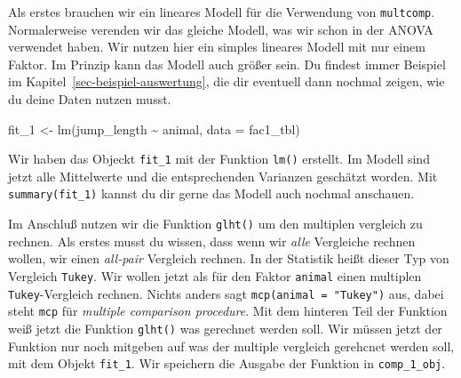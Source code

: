 \documentclass[
  letterpaper,
]{scrbook}
\newenvironment{Shaded}{\begin{snugshade}}{\end{snugshade}}
\newcommand{\AttributeTok}[1]{\textcolor[rgb]{0.40,0.45,0.13}{#1}}
\newcommand{\FunctionTok}[1]{\textcolor[rgb]{0.28,0.35,0.67}{#1}}
\newcommand{\NormalTok}[1]{\textcolor[rgb]{0.00,0.23,0.31}{#1}}
\newcommand{\OtherTok}[1]{\textcolor[rgb]{0.00,0.23,0.31}{#1}}
\newcommand{\SpecialCharTok}[1]{\textcolor[rgb]{0.37,0.37,0.37}{#1}}
\begin{document}

Als erstes brauchen wir ein lineares Modell für die Verwendung von
\texttt{multcomp}. Normalerweise verenden wir das gleiche Modell, was
wir schon in der ANOVA verwendet haben. Wir nutzen hier ein simples
lineares Modell mit nur einem Faktor. Im Prinzip kann das Modell auch
größer sein. Du findest immer Beispiel im
Kapitel~\ref{sec-beispiel-auswertung}, die dir eventuell dann nochmal
zeigen, wie du deine Daten nutzen musst.

\begin{Shaded}
\begin{Highlighting}[]
\NormalTok{fit\_1 }\OtherTok{\textless{}{-}} \FunctionTok{lm}\NormalTok{(jump\_length }\SpecialCharTok{\textasciitilde{}}\NormalTok{ animal, }\AttributeTok{data =}\NormalTok{ fac1\_tbl)}
\end{Highlighting}
\end{Shaded}

Wir haben das Objeckt \texttt{fit\_1} mit der Funktion \texttt{lm()}
erstellt. Im Modell sind jetzt alle Mittelwerte und die entsprechenden
Varianzen geschätzt worden. Mit \texttt{summary(fit\_1)} kannst du dir
gerne das Modell auch nochmal anschauen.


Im Anschluß nutzen wir die Funktion \texttt{glht()} um den multiplen
vergleich zu rechnen. Als erstes musst du wissen, dass wenn wir
\emph{alle} Vergleiche rechnen wollen, wir einen \emph{all-pair}
Vergleich rechnen. In der Statistik heißt dieser Typ von Vergleich
\texttt{Tukey}. Wir wollen jetzt als für den Faktor \texttt{animal}
einen multiplen \texttt{Tukey}-Vergleich rechnen. Nichts anders sagt
\texttt{mcp(animal\ =\ "Tukey")} aus, dabei steht \texttt{mcp} für
\emph{multiple comparison procedure}. Mit dem hinteren Teil der Funktion
weiß jetzt die Funktion \texttt{glht()} was gerechnet werden soll. Wir
müssen jetzt der Funktion nur noch mitgeben auf was der multiple
vergleich gerehcnet werden soll, mit dem Objekt \texttt{fit\_1}. Wir
speichern die Ausgabe der Funktion in \texttt{comp\_1\_obj}.
\end{document}
